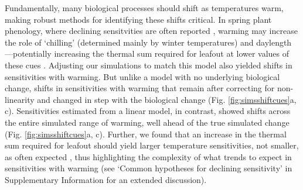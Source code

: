 \documentclass[11pt,letter]{article}
\begin{document}
Fundamentally, many biological processes should shift as temperatures warm, making robust methods for identifying these shifts critical. In spring plant phenology, where declining sensitvities are often reported \citep{fu2015,piao2017,dai2019ag}, warming may increase the role of `chilling' (determined mainly by winter temperatures) and daylength \citep{Laube:2014a,zohner2016}---potentially increasing the thermal sum required for leafout at lower values of these cues \citep{Polgar2014,zohner2017,flynn2018}. Adjusting our simulations to match this model also yielded shifts in sensitivities with warming. But unlike a model with no underlying biological change, shifts in sensitivities with warming that remain after correcting for non-linearity and changed in step with the biological change (Fig. \ref{fig:simsshiftcues}a, c). Sensitivities estimated from a linear model, in contrast, showed shifts across the entire simulated range of warming, well ahead of the true simulated change (Fig. \ref{fig:simsshiftcues}a, c). Further, we found that an increase in the thermal sum required for leafout should yield larger temperature sensitivities, not smaller, as often expected \citep[e.g.,][]{fu2015}, thus highlighting the complexity of what trends to expect in sensitivities with warming (see `Common hypotheses for declining sensitivity' in Supplementary Information for an extended discussion).  \\ %


\end{document}
